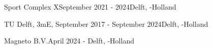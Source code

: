 \begin{rSection}{}
  \begin{experienceItem}
    {Sport Complex X}{September 2021 -  2024}{}{Delft, -Holland}
  \end{experienceItem}

  \begin{experienceItem}
    {TU Delft, 3mE, }{September 2017 - September 2024}{}{Delft, -Holland}
  \end{experienceItem}

  \begin{experienceItem}
    {Magneto B.V.}{April 2024 - }{}{Delft, -Holland}
  \end{experienceItem}

\end{rSection}

